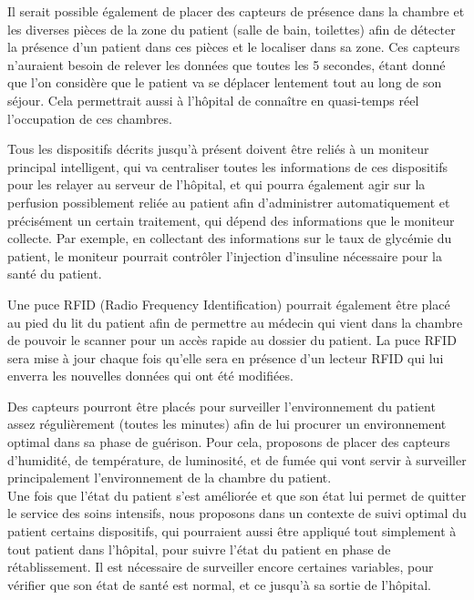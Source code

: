 \documentclass{article}
\begin{document}
Il serait possible également de placer des capteurs de présence dans la chambre et les diverses pièces de la zone du patient (salle de bain, toilettes) afin de détecter la présence d’un patient dans ces pièces et le localiser dans sa zone. Ces capteurs n’auraient besoin de relever les données que toutes les 5 secondes, étant donné que l’on considère que le patient va se déplacer lentement tout au long de son séjour. Cela permettrait aussi à l’hôpital de connaître en quasi-temps réel l’occupation de ces chambres.

Tous les dispositifs décrits jusqu’à présent doivent être reliés à un moniteur principal intelligent, qui va centraliser toutes les informations de ces dispositifs pour les relayer au serveur de l’hôpital, et qui pourra également agir sur la perfusion possiblement reliée au patient afin d’administrer automatiquement et précisément un certain traitement, qui dépend des informations que le moniteur collecte. Par exemple, en collectant des informations sur le taux de glycémie du patient, le moniteur pourrait contrôler l’injection d’insuline nécessaire pour la santé du patient.

Une puce RFID (Radio Frequency Identification) \cite{RFID} pourrait également être placé au pied du lit du patient  afin de permettre au médecin qui vient dans la chambre de pouvoir le scanner pour un accès rapide au dossier du patient. La puce RFID sera mise à jour chaque fois qu’elle sera en présence d’un lecteur RFID qui lui enverra les nouvelles données qui ont été modifiées.

Des capteurs pourront être placés pour surveiller l’environnement du patient assez régulièrement (toutes les minutes) afin de lui procurer un environnement optimal dans sa phase de guérison. Pour cela, proposons de placer des capteurs d’humidité, de température, de luminosité, \cite{HTL} et de fumée qui vont servir à surveiller principalement l'environnement de la chambre du patient. 
\\

Une fois que l'état du patient s'est améliorée et que son état lui permet de quitter le service des soins intensifs, nous proposons dans un contexte de suivi optimal du patient certains dispositifs, qui pourraient aussi être appliqué tout simplement à tout patient dans l'hôpital, pour suivre l'état du patient en phase de rétablissement. Il est nécessaire de surveiller encore certaines variables, pour vérifier que son état de santé est normal, et ce jusqu’à sa sortie de l’hôpital. 
\end{document}
